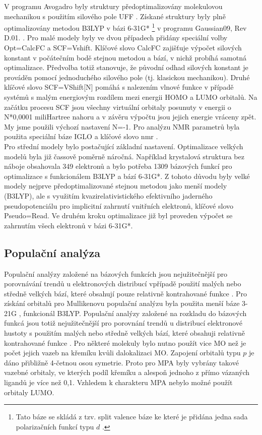\documentclass[
digital, %
table,   %
lof,     %
lot,     %
oneside,
]{fithesis3}
\begin{document}
 V programu Avogadro byly struktury předoptimalizovány molekulovou mechanikou s použitím silového pole UFF \cite{uff_force_filed}. Získané struktury byly plně optimalizovány metodou B3LYP \cite{b3lyp} v bázi 6-31G* \footnote{Tato báze se skládá z tzv. split valence báze \cite{ditchfield1971self} ke které je přidána jedna sada polarizačních funkcí typu $d$ \cite{francl1982self}.} v programu Gaussian09, Rev D.01. \cite{g09}. Pro malé modely byly ve dvou případech přidány speciální volby Opt=CalcFC a SCF=Vshift. Klíčové slovo CalcFC zajišťuje výpočet silových konstant v počátečním bodě stejnou metodou a bází, v nichž probíhá samotná optimalizace. Předvolba totiž stanovuje, že původní odhad silových konstant je prováděn pomocí jednoduchého silového pole (tj. klasickou mechanikou). Druhé klíčové slovo SCF=VShift[N] pomáhá s nalezením vlnové funkce v případě systémů s malým energiovým rozdílem mezi energii HOMO a LUMO orbitalů. Na začátku procesu SCF jsou všechny virtuální orbitaly posunuty v energii o N*0,0001 miliHartree nahoru a v závěru výpočtu jsou jejich energie vráceny zpět. My jsme použili výchozí nastavení N=-1. Pro analýzu NMR parametrů byla použita speciální báze IGLO \cite{iglo} a klíčové slovo nmr \cite{g09}. \\
Pro střední modely bylo postačující základní nastavení. Optimalizace velkých modelů byla již čassově poměrně náročná. Například krystalová struktura bez náboje obsahovala 349 elektronů a bylo potřeba 1309 bázových funkcí pro optimalizace s funkcionálem B3LYP a bází 6-31G*. Z tohoto důvodu byly velké modely nejprve předoptimalizované stejnou metodou jako menší modely (B3LYP), ale s využitím kvazirelativistického efektivního jaderného pseudopotenciálu pro implicitní zahrnutí vnitřních elektronů, klíčové slovo Pseudo=Read. Ve druhém kroku optimalizace již byl proveden výpočet se zahrnutím všech elektronů v bázi 6-31G*.\\
\subsection{Populační analýza}
Populační analýzy založené na bázových funkcích jsou nejužitečnější pro porovnávání trendů u elektronových distribucí  vpřípadě použití malých nebo středně velkých bází, které obsahují pouze relativně kontrahované funkce \cite{jensen2007introduction}.
Pro získání orbitalů pro Mullikenovu populační analýzu byla použita menší báze 3-21G \cite{binkley1980self}, funkcionál B3LYP. Populační analýzy založené na rozkladu do bázových funkcá jsou totiž nejužitečnější pro porovnání trendů u distribucí elektronové hustoty s použitím malých nebo středně velkých bází, které obsahuji relativně kontrahované funkce \cite{jensen2007introduction}. Pro některé molekuly bylo nutno použít vice MO než je počet
jejich vazeb na křemíku kvůli dalokalizaci MO. Zapojení orbitalů typu $p$ je dáno
přibližně 4-četnou osou symetrie. Proto pro MPA byly
vybrány takové vazebné orbitaly, ve kterých podíl křemíku a alespoň
jednoho z přímo vázaných ligandů je více než 0,1. Vzhledem k charakteru
MPA nebylo možné použít orbitaly LUMO. \\
\end{document}
